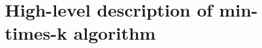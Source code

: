 \documentclass[a4paper]{article}
\begin{document}
\begin{comment}
\subsection{R: results}
\label{ssect:R}

The array $R$ (results) keeps track of the elements picked out by the algorithm: each column represents a subgroup.
Keeping the analogy above (see section~\ref{ssec:pedag}), each column in $R$ shows what people enter the room each time.
Since we want to form subgroups of size $k$ elements, each column in $R$ will comprise $k$ rows.
The number of columns is precisely what we are looking for -- it is equal to \verb:min-size-k:.
Table~\ref{tab:R_0} shows the initial state of this array for $n$ and $k$ elements.
\emph{NA} denotes that the values are not available, since the algorithm has not yet produced any values.
Note also that the number of columns in table~\ref{tab:R_0} is arbitrary -- once this algorithm is implemented the program will just need to start out with one, and add one whenever necessary.

\begin{table}
\centering
\begin{tabular} {| l ||c |c |c |}  
\multicolumn{ 4 }{c}{ R (results) } \\ \hline 
   \ index  & subgroup1 & subgroup2 & \ldots \\ \hline \hline 
0 & NA & NA & \ldots \\ \hline 
1 & NA & NA & \ldots\\ \hline 
2 & NA & NA & \ldots\\ \hline 
\ldots & \ldots & \ldots & \ldots \\ \hline 
$k-1$ & NA & NA & \ldots\\ \hline 
\end{tabular} 
\caption{Elements picked by the algorithm in each subgroup}
\label{tab:R_0}
\end{table}

\end{comment}





\section{High-level description of min-times-k algorithm}
\end{document}
